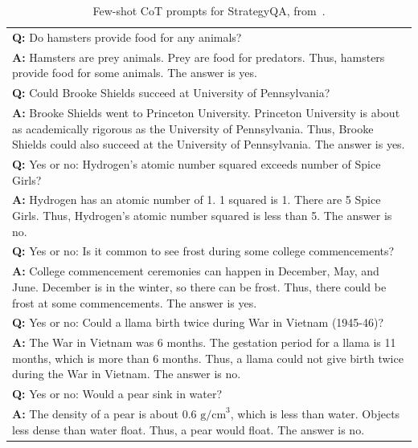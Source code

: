 \begin{table}[h]
    \caption{
    Few-shot CoT prompts for StrategyQA, from~\cite{Wei2022ChainOT}.
    }
    \centering
    \small
    \begin{tabular}{p{13.5cm}}
        \toprule
        \textbf{Q:} Do hamsters provide food for any animals?\\
        \vspace{-1mm}
        \textbf{A:} Hamsters are prey animals. Prey are food for predators. Thus, hamsters provide food for some animals. The answer is yes.\\
        \vspace{0mm}
        \textbf{Q:} Could Brooke Shields succeed at University of Pennsylvania?\\
        \vspace{-1mm}
        \textbf{A:} Brooke Shields went to Princeton University. Princeton University is about as academically rigorous as the University of Pennsylvania. Thus, Brooke Shields could also succeed at the University of Pennsylvania. The answer is yes.\\
        \vspace{0mm}
        \textbf{Q:} Yes or no: Hydrogen's atomic number squared exceeds number of Spice Girls?\\
        \vspace{-1mm}
        \textbf{A:} Hydrogen has an atomic number of 1. 1 squared is 1. There are 5 Spice Girls. Thus, Hydrogen's atomic number squared is less than 5. The answer is no.\\
        \vspace{0mm}
        \textbf{Q:} Yes or no: Is it common to see frost during some college commencements?\\
        \vspace{-1mm}
        \textbf{A:} College commencement ceremonies can happen in December, May, and June. December is in the winter, so there can be frost. Thus, there could be frost at some commencements. The answer is yes.\\
        \vspace{0mm}
        \textbf{Q:} Yes or no: Could a llama birth twice during War in Vietnam (1945-46)?\\
        \vspace{-1mm}
        \textbf{A:} The War in Vietnam was 6 months. The gestation period for a llama is 11 months, which is more than 6 months. Thus, a llama could not give birth twice during the War in Vietnam. The answer is no.\\
        \vspace{0mm}
        \textbf{Q:} Yes or no: Would a pear sink in water?\\
        \vspace{-1mm}
        \textbf{A:} The density of a pear is about 0.6 $\text{g/cm}^3$, which is less than water. Objects less dense than water float. Thus, a pear would float. The answer is no.\\
        \bottomrule
    \end{tabular}
    \label{tab:prompt-strategyqa}
\end{table}

